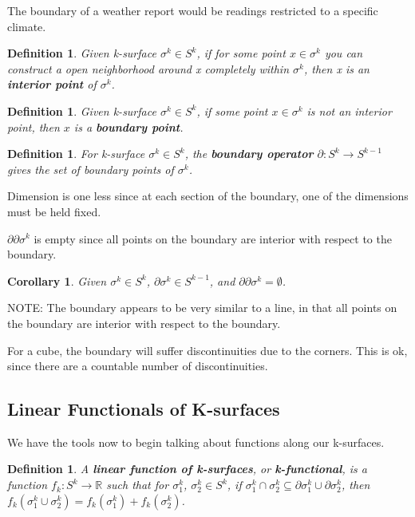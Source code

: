 \documentclass{book}
\newtheorem{defn}[equation]{Definition}
\newtheorem{coro}[equation]{Corollary}
\begin{document}
The boundary of a weather report would be readings restricted to a specific climate. 


\begin{defn}
	Given k-surface $\sigma^k \in S^k$, if for some point $x \in \sigma^k$ you can construct a open neighborhood around x completely within $\sigma^k$, then x is an \textbf{interior point} of $\sigma^k$. 
\end{defn}

\begin{defn}
	Given k-surface $\sigma^k \in S^k$, if some point $x \in \sigma^k$ is not an interior point, then $x$ is a \textbf{boundary point}.
\end{defn}



\begin{defn}
	For k-surface $\sigma^k \in S^k$, the \textbf{boundary operator} $\partial : S^k \to S^{k-1}$ gives the set of boundary points of $\sigma^k$. 
\end{defn}


Dimension is one less since at each section of the boundary, one of the dimensions must be held fixed.

$\partial\partial \sigma^k$ is empty since all points on the boundary are interior with respect to the boundary.


\begin{coro}
	Given $\sigma^k \in S^k$, $\partial \sigma^k \in S^{k-1}$, and $\partial\partial \sigma^k = \emptyset$. 
\end{coro}


NOTE: The boundary appears to be very similar to a line, in that all points on the boundary are interior with respect to the boundary. 

For a cube, the boundary will suffer discontinuities due to the corners. This is ok, since there are a countable number of discontinuities. 

\subsection{Linear Functionals of K-surfaces}

We have the tools now to begin talking about functions along our k-surfaces. 


\begin{defn}
	A \textbf{linear function of k-surfaces}, or \textbf{k-functional}, is a function $f_k : S^k \to \mathbb{R}$ such that for $\sigma^k_1$, $\sigma^k_2 \in S^k$, if $\sigma^k_1 \cap \sigma^k_2 \subseteq \partial \sigma^k_1 \cup \partial \sigma^k_2$, then $f_k(\sigma^k_1\cup \sigma^k_2) = f_k(\sigma^k_1) + f_k(\sigma^k_2)$. 
\end{defn}
\end{document}
